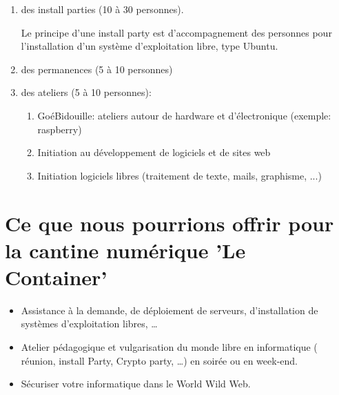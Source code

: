 \documentclass[
bibliography=totoc,
headings=big,
captions=tableheading,
chapterprefix=true%
]{scrreprt}
\begin{document}
\begin{enumerate}

\item des install parties (10 à 30 personnes). 

    Le principe d'une install party est d'accompagnement des personnes pour l'installation d'un système d'exploitation libre, type Ubuntu. 

\item des permanences (5 à 10 personnes)        

\item des ateliers (5 à 10 personnes): 

\begin{enumerate}

\item    GoéBidouille: ateliers autour de hardware et d'électronique (exemple: raspberry)

\item    Initiation au développement de logiciels et de sites web

\item    Initiation logiciels libres (traitement de texte, mails, graphisme, ...)

\end{enumerate}

\end{enumerate}
        

\section*{Ce que nous pourrions offrir pour la cantine numérique 'Le Container'}


\begin{itemize}

\item    Assistance à la demande, de déploiement de serveurs, d’installation de systèmes d’exploitation libres, \dots

\item  Atelier pédagogique et vulgarisation du monde libre en informatique ( réunion, install Party, Crypto party, \dots) en soirée ou en week-end.

\item Sécuriser votre informatique dans le World Wild Web.

\end{itemize}
\end{document}
